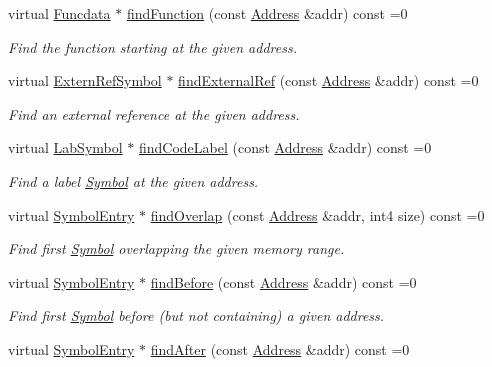 \begin{DoxyCompactItemize}
virtual \mbox{\hyperlink{class_funcdata}{Funcdata}} $\ast$ \mbox{\hyperlink{class_scope_a2c621196f6fdb4b8ce4ee1f3dc953107}{find\+Function}} (const \mbox{\hyperlink{class_address}{Address}} \&addr) const =0
\begin{DoxyCompactList}\small\item\em Find the function starting at the given address. \end{DoxyCompactList}\item 
virtual \mbox{\hyperlink{class_extern_ref_symbol}{Extern\+Ref\+Symbol}} $\ast$ \mbox{\hyperlink{class_scope_af69e0f77b621a3ba6436f8a1c0010d1c}{find\+External\+Ref}} (const \mbox{\hyperlink{class_address}{Address}} \&addr) const =0
\begin{DoxyCompactList}\small\item\em Find an {\itshape external} {\itshape reference} at the given address. \end{DoxyCompactList}\item 
virtual \mbox{\hyperlink{class_lab_symbol}{Lab\+Symbol}} $\ast$ \mbox{\hyperlink{class_scope_af4bac52b9d64974b87432c0379cc38c6}{find\+Code\+Label}} (const \mbox{\hyperlink{class_address}{Address}} \&addr) const =0
\begin{DoxyCompactList}\small\item\em Find a label \mbox{\hyperlink{class_symbol}{Symbol}} at the given address. \end{DoxyCompactList}\item 
virtual \mbox{\hyperlink{class_symbol_entry}{Symbol\+Entry}} $\ast$ \mbox{\hyperlink{class_scope_a3395b6194a59515caa1ede92fd6ac511}{find\+Overlap}} (const \mbox{\hyperlink{class_address}{Address}} \&addr, int4 size) const =0
\begin{DoxyCompactList}\small\item\em Find first \mbox{\hyperlink{class_symbol}{Symbol}} overlapping the given memory range. \end{DoxyCompactList}\item 
virtual \mbox{\hyperlink{class_symbol_entry}{Symbol\+Entry}} $\ast$ \mbox{\hyperlink{class_scope_a1c2e83ba66c61b449d85b492b1539625}{find\+Before}} (const \mbox{\hyperlink{class_address}{Address}} \&addr) const =0
\begin{DoxyCompactList}\small\item\em Find first \mbox{\hyperlink{class_symbol}{Symbol}} before (but not containing) a given address. \end{DoxyCompactList}\item 
virtual \mbox{\hyperlink{class_symbol_entry}{Symbol\+Entry}} $\ast$ \mbox{\hyperlink{class_scope_a543041620f4398f00d2cc78edc1901b4}{find\+After}} (const \mbox{\hyperlink{class_address}{Address}} \&addr) const =0

\end{DoxyCompactItemize}
